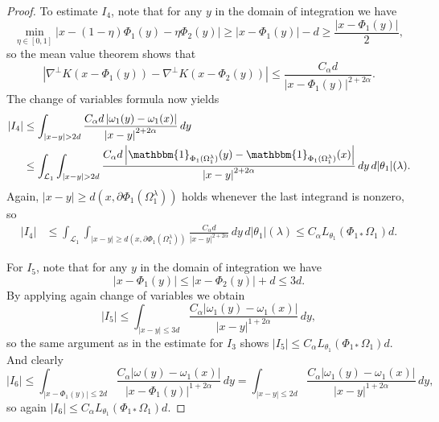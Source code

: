 \documentclass[reqno,centertags,12pt]{amsart}
\theoremstyle{definition}
\numberwithin{equation}{section}
\newcommand{\abs}[1]{\left\lvert#1\right\rvert}
\begin{document}
\begin{proof}
    To estimate $I_{4}$, note that for any $y$ in the domain of integration we have
    \[
        \min_{\eta\in[0,1]}
        \abs{x - (1-\eta)\Phi_{1}(y) - \eta\Phi_{2}(y)}
        \geq \abs{x - \Phi_{1}(y)} - d
        \geq \frac{\abs{x - \Phi_{1}(y)}}{2},
    \]
     so the mean value theorem shows that
    \[
        \abs{\nabla^{\perp}K(x - \Phi_{1}(y)) - \nabla^{\perp}K(x - \Phi_{2}(y))}
        \leq \frac{C_{\alpha}d}{\abs{x - \Phi_{1}(y)}^{2 + 2\alpha}}.
    \]
    The change of variables formula now yields
    \begin{align*}
        \abs{I_{4}} &\leq \int_{\abs{x - y} > 2d}
        \frac{C_{\alpha}d\abs{\omega_{1}(y) - \omega_{1}(x)}}
        {\abs{x - y}^{2 + 2\alpha}}\,dy \\
        &\leq \int_{\mathcal{L}_{1}}\int_{\abs{x - y} > 2d}
        \frac{C_{\alpha}d\abs{\mathbbm{1}_{\Phi_{1}(\Omega_{1}^{\lambda})}(y)
        - \mathbbm{1}_{\Phi_{1}(\Omega_{1}^{\lambda})}(x)}}
        {\abs{x - y}^{2 + 2\alpha}}\,dy\,d|\theta_{1}|(\lambda).
    \end{align*}
    Again, $\abs{x - y} \geq d(x,\partial\Phi_{1}(\Omega_{1}^{\lambda}))$
    holds whenever the last integrand  is nonzero, so
    \begin{align*}
        \abs{I_{4}} &\leq \int_{\mathcal{L}_{1}}
        \int_{\abs{x - y}\geq d(x,\partial\Phi_{1}(\Omega_{1}^{\lambda}))}
        \frac{C_{\alpha}d}{\abs{x - y}^{2+2\alpha}}\,dy\,d|\theta_{1}|(\lambda)
        \leq C_{\alpha}L_{\theta_{1}}(\Phi_{1*}\Omega_{1})d.
    \end{align*}

    For $I_{5}$, note that for any $y$ in the domain of integration we have
    \[
        \abs{x - \Phi_{1}(y)} \leq \abs{x - \Phi_{2}(y)} + d \leq 3d.
    \]
    By applying again  change of variables we obtain
    \[
        \abs{I_{5}} \leq \int_{\abs{x - y} \leq 3d}
        \frac{C_{\alpha}\abs{\omega_{1}(y) - \omega_{1}(x)}}{\abs{x - y}^{1 + 2\alpha}}\,dy,
    \]
    so the same argument as in the estimate for $I_{3}$
    shows $\abs{I_{5}} \leq C_{\alpha}L_{\theta_{1}}(\Phi_{1*}\Omega_{1})d$.
And clearly
    \[
        \abs{I_{6}} \leq \int_{\abs{x - \Phi_{1}(y)} \leq 2d}
        \frac{C_{\alpha}\abs{\omega(y) - \omega_{1}(x)}}
        {\abs{x - \Phi_{1}(y)}^{1+2\alpha}}\,dy
        = \int_{\abs{x - y}\leq 2d}\frac{C_{\alpha}\abs{\omega_{1}(y) - \omega_{1}(x)}}
        {\abs{x - y}^{1+2\alpha}}\,dy,
    \]
    so again $\abs{I_{6}} \leq C_{\alpha}L_{\theta_{1}}(\Phi_{1*}\Omega_{1})d$.


\end{proof}
\end{document}
